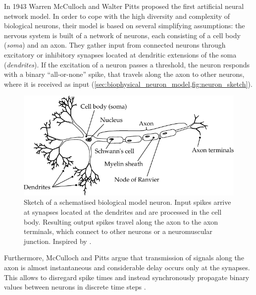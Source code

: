 In 1943 Warren McCulloch and Walter Pitts proposed the first artificial neural network model. In order to cope with the high diversity and complexity of biological neurons, their model is based on several simplifying assumptions: the nervous system is built of a network of neurons, each consisting of a cell body (\emph{soma}) and an axon. They gather input from connected neurons through excitatory or inhibitory synapses located at dendritic extensions of the soma (\emph{dendrites}). If the excitation of a neuron passes a threshold, the neuron responds with a binary \enquote{all-or-none} spike, that travels along the axon to other neurons, where it is received as input (\cref{sec:biophysical_neuron_model,fig:neuron_sketch}).
\begin{figure}
	\centering
	\includegraphics[width=\textwidth]{media/chp2/neuron_sketch.pdf}
	\caption[Sketch of a schematised model neuron]{Sketch of a schematised biological model neuron. Input spikes arrive at synapses located at the dendrites and are processed in the cell body. Resulting output spikes travel along the axon to the axon terminals, which connect to other neurons or a neuromuscular junction. Inspired by \cite{kandel2012principles}.}
	\label{fig:neuron_sketch}
\end{figure}
Furthermore, McCulloch and Pitts argue that transmission of signals along the axon is almost instantaneous and considerable delay occurs only at the synapses. This allows to disregard spike times and instead synchronously propagate binary values between neurons in discrete time steps \cite{mcculloch1943logical}.

